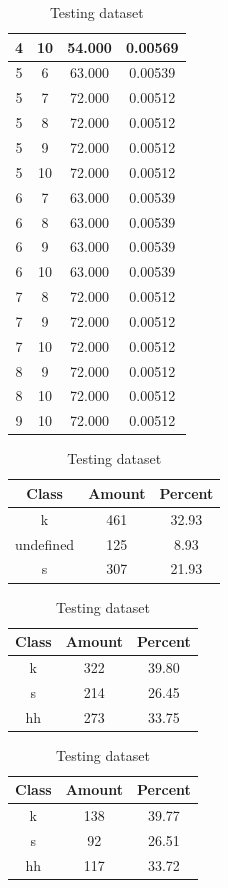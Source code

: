\begin{table}
\begin{subtable}[h]{0.45\textwidth}
{\begin{tabular}{|c|c|c|c|}
 4 & 10 & 54.000 & 0.00569\\ \hline 
 5 & 6 & 63.000 & 0.00539\\ \hline 
 5 & 7 & 72.000 & 0.00512\\ \hline 
 5 & 8 & 72.000 & 0.00512\\ \hline 
 5 & 9 & 72.000 & 0.00512\\ \hline 
 5 & 10 & 72.000 & 0.00512\\ \hline 
 6 & 7 & 63.000 & 0.00539\\ \hline 
 6 & 8 & 63.000 & 0.00539\\ \hline 
 6 & 9 & 63.000 & 0.00539\\ \hline 
 6 & 10 & 63.000 & 0.00539\\ \hline 
 7 & 8 & 72.000 & 0.00512\\ \hline 
 7 & 9 & 72.000 & 0.00512\\ \hline 
 7 & 10 & 72.000 & 0.00512\\ \hline 
 8 & 9 & 72.000 & 0.00512\\ \hline 
 8 & 10 & 72.000 & 0.00512\\ \hline 
 9 & 10 & 72.000 & 0.00512\\ \hline 

\end{tabular}
}\label{xlscentroid2010}
\caption{xcscentroid2010}
\end{subtable}

\begin{subtable}[h]{0.45\textwidth}
\centering
\begin{tabular}{|c|c|c|}
\hline
Class & Amount & Percent\\ \hline
k & 461 & 32.93\\ \hline
undefined & 125 & 8.93\\ \hline
s & 307 & 21.93\\ \hline
\end{tabular}
\caption{Entire dataset after stripping short sounds}
\end{subtable}
\hfill
\begin{subtable}[h]{0.45\textwidth}
\centering
\begin{tabular}{|c|c|c|}
\hline
Class & Amount & Percent\\ \hline
k & 322 & 39.80\\ \hline
s & 214 & 26.45\\ \hline
hh & 273 & 33.75\\ \hline
\end{tabular}
\caption{Training dataset}
\end{subtable}
\hfill
\begin{subtable}[h]{0.45\textwidth}
\centering
\begin{tabular}{|c|c|c|}
\hline
Class & Amount & Percent\\ \hline
k & 138 & 39.77\\ \hline
s & 92 & 26.51\\ \hline
hh & 117 & 33.72\\ \hline
\end{tabular}
\caption{Testing dataset}
\end{subtable}
\hfill


\end{table}
